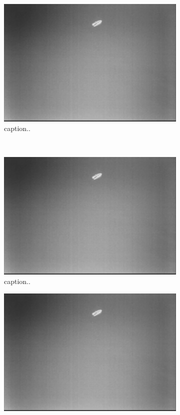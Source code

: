 \begin{figure}[ht]
	\centering
	\begin{subfigure}[b]{0.45\textwidth}
		\includegraphics[width=\textwidth]{fig1}
		\caption{caption..}
		\label{fig:2a}
	\end{subfigure}
	~ %
	\begin{subfigure}[b]{0.45\textwidth}
		\includegraphics[width=\textwidth]{fig1}
		\caption{caption..}
		\label{fig:2b}
	\end{subfigure}
	\begin{subfigure}[b]{0.45\textwidth}
		\includegraphics[width=\textwidth]{fig1}

\end{subfigure}
\end{figure}

